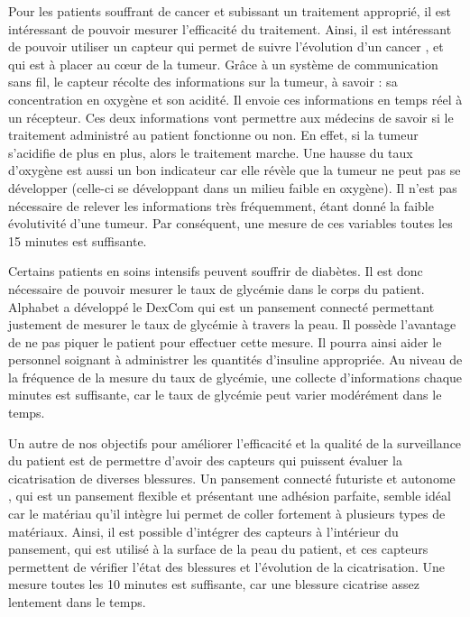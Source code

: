 \documentclass{article}
\begin{document}
Pour les patients souffrant de cancer et subissant un traitement approprié, il est intéressant de pouvoir mesurer l’efficacité du traitement. Ainsi, il est intéressant de pouvoir utiliser un capteur qui permet de suivre l’évolution d’un cancer \cite{Cancer}, et qui est à placer au cœur de la tumeur. Grâce à un système de communication sans fil, le capteur récolte des informations sur la tumeur, à savoir : sa concentration en oxygène et son acidité. Il envoie ces informations en temps réel à un récepteur. Ces deux informations vont permettre aux médecins de savoir si le traitement administré au patient fonctionne ou non. En effet, si la tumeur s’acidifie de plus en plus, alors le traitement marche. Une hausse du taux d’oxygène est aussi un bon indicateur car elle révèle que la tumeur ne peut pas se développer (celle-ci se développant dans un milieu faible en oxygène). Il n’est pas nécessaire de relever les informations très fréquemment, étant donné la faible évolutivité d’une tumeur. Par conséquent, une mesure de ces variables toutes les 15 minutes est suffisante.

Certains patients en soins intensifs peuvent souffrir de diabètes. Il est donc nécessaire de pouvoir mesurer le taux de glycémie dans le corps du patient. Alphabet a développé le DexCom \cite{Diabete} qui  est un pansement connecté permettant justement de mesurer le taux de glycémie à travers la peau. Il possède l’avantage de ne pas piquer le patient pour effectuer cette mesure. Il pourra ainsi aider le personnel soignant à administrer les quantités d’insuline appropriée. Au niveau de la fréquence de la mesure du taux de glycémie, une collecte d’informations chaque minutes est suffisante, car le taux de glycémie peut varier modérément dans le temps.

Un autre de nos objectifs pour améliorer l’efficacité et la qualité de la surveillance du patient est de permettre d’avoir des capteurs qui puissent évaluer la cicatrisation de diverses blessures. Un pansement connecté futuriste et autonome \cite{Pansement}, qui est un pansement flexible et présentant une adhésion parfaite, semble idéal car le matériau qu’il intègre lui permet de coller fortement à plusieurs types de matériaux. Ainsi, il est possible d’intégrer des capteurs à l’intérieur du pansement, qui est utilisé à la surface de la peau du patient, et ces capteurs permettent de vérifier l’état des blessures et l’évolution de la cicatrisation. Une mesure toutes les 10 minutes est suffisante, car une blessure cicatrise assez lentement dans le temps.
\end{document}
